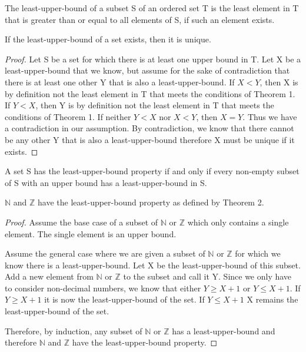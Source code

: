 \documentclass[12pt]{article}
\newcommand{\N}{\mathbb{N}}
\newcommand{\Z}{\mathbb{Z}}
\newenvironment{theorem}[2][Theorem]{\begin{trivlist}
\item[\hskip \labelsep {\bfseries #1}\hskip \labelsep {\bfseries #2.}]}{\end{trivlist}}
\newenvironment{proposition}[2][Proposition]{\begin{trivlist}
\item[\hskip \labelsep {\bfseries #1}\hskip \labelsep {\bfseries #2.}]}{\end{trivlist}}
\begin{document}
\begin{theorem}{1}
The least-upper-bound of a subset S of an ordered set T is the least element in T that is greater than or equal to all elements of S, if such an element exists.
\end{theorem}
\begin{proposition}{3}
If the least-upper-bound of a set exists, then it is unique.
\end{proposition}
\begin{proof}
Let S be a set for which there is at least one upper bound in T. Let X be a least-upper-bound that we know, but assume for the sake of contradiction that there is at least one other Y that is also a least-upper-bound. If $X<Y$, then X is by definition not the least element in T that meets the conditions of Theorem 1. If $Y<X$, then Y is by definition not the least element in T that meets the conditions of Theorem 1. If neither $Y<X$ nor $X<Y$, then $X=Y$. Thus we have a contradiction in our assumption. By contradiction, we know that there cannot be any other Y that is also a least-upper-bound therefore X must be unique if it exists.
\end{proof}

\begin{theorem}{2}
A set S has the least-upper-bound property if and only if every non-empty subset of S with an upper bound has a least-upper-bound in S. 
\end{theorem}
\begin{proposition}{4}
$\N$ and $\Z$ have the least-upper-bound property as defined by Theorem 2.
\end{proposition}
\begin{proof}
Assume the base case of a subset of $\N$ or $\Z$ which only contains a single element. The single element is an upper bound.

Assume the general case where we are given a subset of $\N$ or $\Z$ for which we know there is a least-upper-bound. Let X be the least-upper-bound of this subset. Add a new element from $\N$ or $\Z$ to the subset and call it Y. Since we only have to consider non-decimal numbers, we know that either $Y\geq X+1$ or $Y\leq X+1$. If $Y\geq X+1$ it is now the least-upper-bound of the set. If $Y\leq X+1$ X remains the least-upper-bound of the set.

Therefore, by induction, any subset of $\N$ or $\Z$ has a least-upper-bound and therefore $\N$ and $\Z$ have the least-upper-bound property.
\end{proof}


 
 
\end{document}
